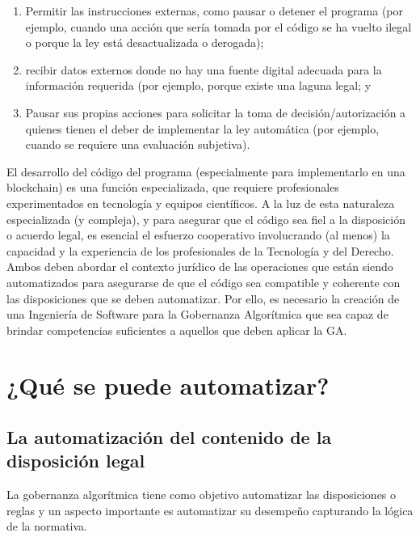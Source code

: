 \documentclass[12pt]{report} %
\begin{document}
\begin{enumerate}
    \item Permitir las instrucciones externas, como pausar o detener el programa (por ejemplo, cuando una acción que sería tomada por el código se ha vuelto ilegal o porque la ley está desactualizada o derogada);
    
    \item{recibir datos externos donde no hay una fuente digital adecuada para la información requerida (por ejemplo, porque existe una laguna legal; y}
    
    \item{Pausar sus propias acciones para solicitar la toma de decisión/autorización a quienes tienen el deber de implementar la ley automática (por ejemplo, cuando se requiere una evaluación subjetiva).}
\end{enumerate}

El desarrollo del código del programa (especialmente para implementarlo en una blockchain) es una función especializada, que requiere profesionales experimentados en tecnología y equipos científicos. A la luz de esta naturaleza especializada (y compleja), y para asegurar que el código sea fiel a la disposición o acuerdo legal, es esencial el esfuerzo cooperativo involucrando (al menos) la capacidad y la experiencia de los profesionales de la Tecnología y del Derecho. Ambos deben abordar el contexto jurídico de las operaciones que están siendo automatizados para asegurarse de que el código sea compatible y coherente con las disposiciones que se deben automatizar. Por ello, es necesario la creación de una Ingeniería de Software para la Gobernanza Algorítmica que sea capaz de brindar competencias suficientes a aquellos que deben aplicar la GA.

\section{¿Qué se puede automatizar?}

\subsection{La automatización del contenido de la disposición legal}

La gobernanza algorítmica tiene como objetivo automatizar las disposiciones o reglas y un aspecto importante es automatizar su desempeño capturando la lógica de la normativa. 
\end{document}
